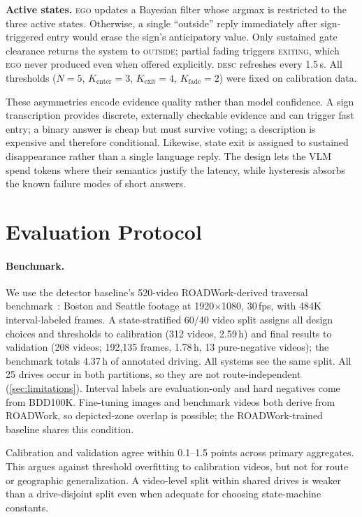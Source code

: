 \documentclass[10pt,twocolumn,letterpaper]{article}
\begin{document}
\textbf{Active states.}  \textsc{ego} updates a Bayesian filter whose argmax is restricted to the three active states.  Otherwise, a single ``outside'' reply immediately after sign-triggered entry would erase the sign's anticipatory value.  Only sustained gate clearance returns the system to \textsc{outside}; partial fading triggers \textsc{exiting}, which \textsc{ego} never produced even when offered explicitly.  \textsc{desc} refreshes every 1.5\,s.  All thresholds ($N{=}5$, $K_\text{enter}{=}3$, $K_\text{exit}{=}4$, $K_\text{fade}{=}2$) were fixed on calibration data.

These asymmetries encode evidence quality rather than model confidence.  A sign transcription provides discrete, externally checkable evidence and can trigger fast entry; a binary answer is cheap but must survive voting; a description is expensive and therefore conditional.  Likewise, state exit is assigned to sustained disappearance rather than a single language reply.  The design lets the VLM spend tokens where their semantics justify the latency, while hysteresis absorbs the known failure modes of short answers.



\section{Evaluation Protocol}
\label{sec:protocol}

\paragraph{Benchmark.} We use the detector baseline's 520-video ROADWork-derived traversal benchmark~\cite{priorsystem2026}: Boston and Seattle footage at 1920$\times$1080, 30\,fps, with 484K interval-labeled frames.  A state-stratified 60/40 video split assigns all design choices and thresholds to calibration (312 videos, 2.59\,h) and final results to validation (208 videos; 192{,}135 frames, 1.78\,h, 13 pure-negative videos); the benchmark totals 4.37\,h of annotated driving.  All systems see the same split.  All 25 drives occur in both partitions, so they are not route-independent (\cref{sec:limitations}).  Interval labels are evaluation-only and hard negatives come from BDD100K.  Fine-tuning images and benchmark videos both derive from ROADWork, so depicted-zone overlap is possible; the ROADWork-trained baseline shares this condition.

Calibration and validation agree within 0.1--1.5 points across primary aggregates.  This argues against threshold overfitting to calibration videos, but not for route or geographic generalization.  A video-level split within shared drives is weaker than a drive-disjoint split even when adequate for choosing state-machine constants.
\end{document}
